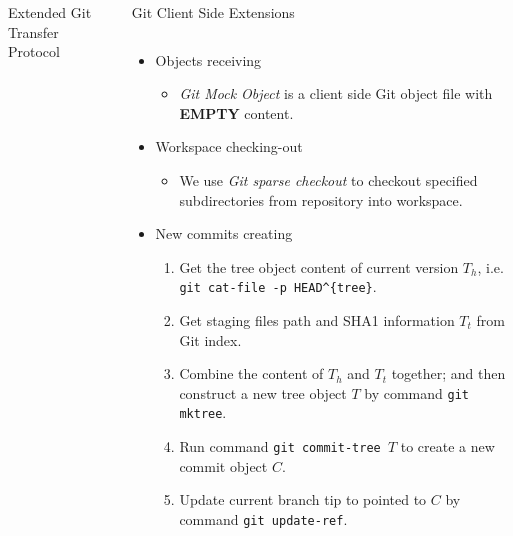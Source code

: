 \documentclass[final]{beamer}
\begin{document}
\begin{frame}[t, fragile]
\begin{columns}[t]
\begin{column}{.49\linewidth}
\begin{block}{Extended Git Transfer Protocol}
      \end{block}
    \end{column}
    \begin{column}{.49\linewidth}
      \begin{block}{Git Client Side Extensions}
        \begin{columns}[T]
            \begin{column}{.5\textwidth}
\begin{itemize}
  \justifying
  \item Objects receiving
    \begin{itemize}
      \item \emph{Git Mock Object} is a client side Git object file with
        \textbf{EMPTY} content.
    \end{itemize}
  \item Workspace checking-out
    \begin{itemize}
    \item We use \emph{Git sparse checkout} to checkout specified
      subdirectories from repository into workspace.
    \end{itemize}
  \item New commits creating
\begin{enumerate}
  \item Get the tree object content of current version $T_h$, i.e. \\
        \verb|git cat-file -p HEAD^{tree}|.

  \item Get staging files path and SHA1 information $T_t$ from Git index.

  \item Combine the content of $T_h$ and $T_t$ together; and then construct a
        new tree object $T$ by command \verb|git mktree|.

  \item Run command \verb|git commit-tree |$T$ to create a new commit object
        $C$.

  \item Update current branch tip to pointed to $C$ by command
    \verb|git update-ref|.
\end{enumerate}
\end{itemize}


\end{column}
\end{columns}
\end{block}
\end{column}
\end{columns}
\end{frame}
\end{document}
